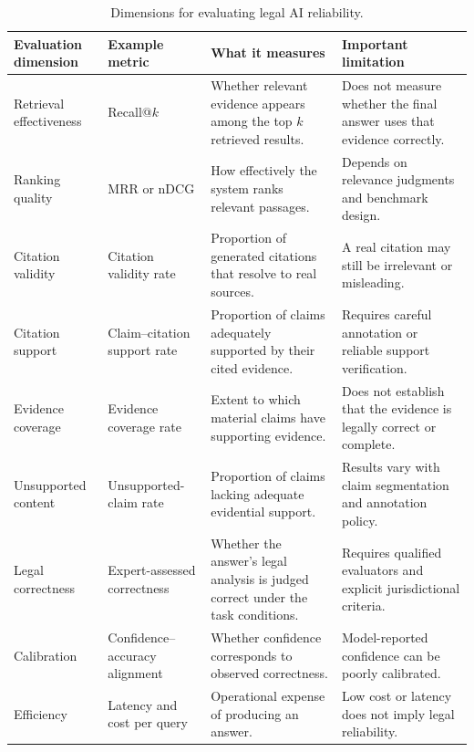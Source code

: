 \begin{table}[tp]
\centering
\caption{Dimensions for evaluating legal AI reliability.}
\label{tab:releval}
\footnotesize
\setlength{\tabcolsep}{5pt}
\renewcommand{\arraystretch}{1.3}
\begin{tabularx}{\textwidth}{>{\raggedright\arraybackslash}p{2.6cm} >{\raggedright\arraybackslash}p{2.9cm} >{\raggedright\arraybackslash}X >{\raggedright\arraybackslash}X}
\toprule
\textbf{Evaluation dimension} & \textbf{Example metric} & \textbf{What it measures} & \textbf{Important limitation} \\
\midrule
Retrieval effectiveness & Recall@$k$ & Whether relevant evidence appears among the top $k$ retrieved results. & Does not measure whether the final answer uses that evidence correctly. \\
Ranking quality & MRR or nDCG & How effectively the system ranks relevant passages. & Depends on relevance judgments and benchmark design. \\
Citation validity & Citation validity rate & Proportion of generated citations that resolve to real sources. & A real citation may still be irrelevant or misleading. \\
Citation support & Claim--citation support rate & Proportion of claims adequately supported by their cited evidence. & Requires careful annotation or reliable support verification. \\
Evidence coverage & Evidence coverage rate & Extent to which material claims have supporting evidence. & Does not establish that the evidence is legally correct or complete. \\
Unsupported content & Unsupported-claim rate & Proportion of claims lacking adequate evidential support. & Results vary with claim segmentation and annotation policy. \\
Legal correctness & Expert-assessed correctness & Whether the answer's legal analysis is judged correct under the task conditions. & Requires qualified evaluators and explicit jurisdictional criteria. \\
Calibration & Confidence--accuracy alignment & Whether confidence corresponds to observed correctness. & Model-reported confidence can be poorly calibrated. \\
Efficiency & Latency and cost per query & Operational expense of producing an answer. & Low cost or latency does not imply legal reliability. \\
\bottomrule
\end{tabularx}
\end{table}

